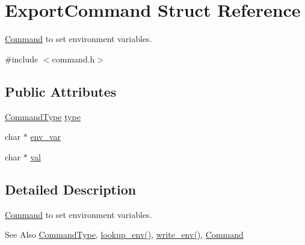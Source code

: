 \hypertarget{structExportCommand}{\section{Export\-Command Struct Reference}
\label{structExportCommand}
}


\hyperlink{unionCommand}{Command} to set environment variables.  




{\ttfamily \#include $<$command.\-h$>$}

\subsection*{Public Attributes}
\begin{DoxyCompactItemize}
\item 
\hyperlink{command_8h_a21e038f5b8958e203d28bc4f18472352}{Command\-Type} \hyperlink{structExportCommand_a6089a285f9584b6f1c5430b46a9c0758}{type}
\item 
char $\ast$ \hyperlink{structExportCommand_a8343f52c0f5198ccb21ed3f0c13d5842}{env\-\_\-var}
\item 
char $\ast$ \hyperlink{structExportCommand_a8e75db85606e5f9cfcc149c116c3be51}{val}
\end{DoxyCompactItemize}


\subsection{Detailed Description}
\hyperlink{unionCommand}{Command} to set environment variables. 

\begin{DoxySeeAlso}{See Also}
\hyperlink{command_8h_aa8311e0de296df9816965be35c31d925}{Command\-Type}, \hyperlink{execute_8c_afeab372587374ba444aa9bdfb6cfa0d8}{lookup\-\_\-env()}, \hyperlink{execute_8h_afa91981c1edd7bb1c86292d80b27e170}{write\-\_\-env()}, \hyperlink{unionCommand}{Command} 
\end{DoxySeeAlso}


